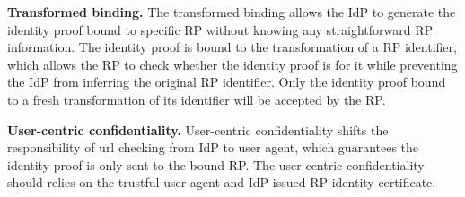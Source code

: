 \vspace{1mm}\noindent \textbf{Transformed binding.}
The transformed binding allows the IdP to generate the identity proof bound to specific RP without knowing any straightforward RP information.
The identity proof is bound to the transformation of a RP identifier, which allows the RP to check whether the identity proof is for it while preventing the IdP from inferring the original RP identifier. Only the identity proof bound to a fresh transformation of its identifier will be accepted by the RP.


\vspace{1mm}\noindent \textbf{User-centric confidentiality.}
User-centric confidentiality shifts the responsibility of url checking from IdP to user agent, which guarantees the identity proof is only sent to the bound RP. The user-centric confidentiality should relies on the trustful user agent and IdP issued RP identity certificate. 

